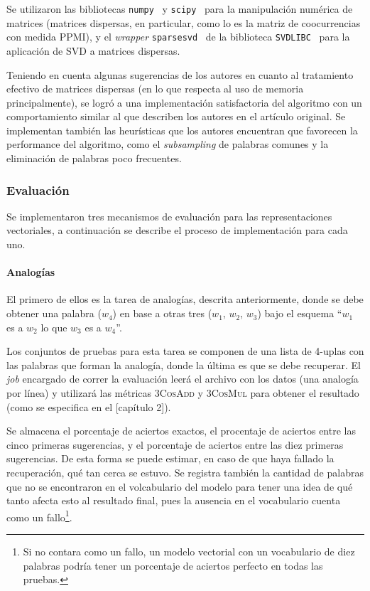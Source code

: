 Se utilizaron las bibliotecas \texttt{numpy}~\cite{NumPy} y \texttt{scipy}~\cite{SciPy} para la
manipulación numérica de matrices (matrices dispersas, en particular, como lo es la matriz de coocurrencias
con medida PPMI), y el \textit{wrapper} \texttt{sparsesvd}~\cite{sparsesvd} de la biblioteca
\texttt{SVDLIBC}~\cite{SVDLIBC} para la aplicación de SVD a matrices dispersas.

Teniendo en cuenta algunas sugerencias de los autores en cuanto al tratamiento efectivo de matrices
dispersas (en lo que respecta al uso de memoria principalmente), se logró a una implementación
satisfactoria del algoritmo con un comportamiento similar al que describen los autores en el
artículo original. Se implementan también las heurísticas que los autores encuentran que favorecen
la performance del algoritmo, como el \textit{subsampling} de palabras comunes y la eliminación de
palabras poco frecuentes.


\subsubsection{Evaluación}

Se implementaron tres mecanismos de evaluación para las representaciones vectoriales, a
continuación se describe el proceso de implementación para cada uno.


\paragraph{Analogías}

El primero de ellos es la tarea de analogías, descrita anteriormente, donde se debe obtener una
palabra ($w_4$) en base a otras tres ($w_1$, $w_2$, $w_3$) bajo el esquema ``$w_1$ es a $w_2$ lo que
$w_3$ es a $w_4$''.

Los conjuntos de pruebas para esta tarea se componen de una lista de 4-uplas con las palabras que
forman la analogía, donde la última es que se debe recuperar. El \textit{job} encargado de correr la
evaluación leerá el archivo con los datos (una analogía por línea) y utilizará las métricas
\textsc{3CosAdd} y \textsc{3CosMul} para obtener el resultado (como se especifica en el [capítulo
2]).

Se almacena el porcentaje de aciertos exactos, el procentaje de aciertos entre las cinco primeras
sugerencias, y el porcentaje de aciertos entre las diez primeras sugerencias. De esta forma se puede
estimar, en caso de que haya fallado la recuperación, qué tan cerca se estuvo. Se registra también
la cantidad de palabras que no se encontraron en el volcabulario del modelo para tener una idea de
qué tanto afecta esto al resultado final, pues la ausencia en el vocabulario cuenta como un
fallo\footnote{Si no contara como un fallo, un modelo vectorial con un vocabulario de diez palabras
podría tener un porcentaje de aciertos perfecto en todas las pruebas.}.


